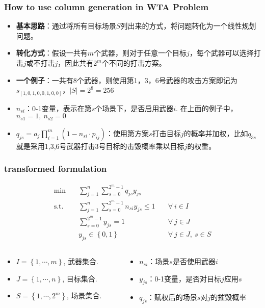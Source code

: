 \documentclass[CJK,10pt]{beamer}
\newcommand{\sumFromTo}[3]{\ensuremath{\sum_{#1}^{#2} #3}}
\newcommand{\optimalProblem}[3]
{\begin{align*}
    #1 \quad &#2 \\
    \mathrm{s. t.}\quad&#3
\end{align*}}
\begin{document}
\begin{frame}
    \frametitle{How to use column generation in WTA Problem}
    \begin{itemize}
		\item \textbf{基本思路}：通过将所有目标场景$S$列出来的方式，将问题转化为一个线性规划问题。
		\item \textbf{转化方式}：假设一共有$m$个武器，则对于任意一个目标$j$，每个武器可以选择打击$j$或不打击$j$，因此共有$2^m$个不同的打击方案。
		\item \textbf{一个例子}：一共有8个武器，则使用第1，3，6号武器的攻击方案即记为$s_{[1,0,1,0,0,1,0,0]}$，$|S| = 2^8 = 256$
		\item $n_{si}$：0-1变量，表示在第$s$个场景下，是否启用武器$i$. 在上面的例子中，$n_{s1} = 1,\ n_{s2} = 0$
		\item $q_{js} = a_j \prod_{i = 1}^m (1 - n_{si}\cdot p_{ij})$：使用第方案$s$打击目标$j$的概率并加权，比如$q_{3s}$就是采用1,3,6号武器打击$3$号目标的击毁概率乘以目标$j$的权重。
	\end{itemize}
\end{frame}

\begin{frame}
    \frametitle{transformed formulation}
    \optimalProblem{\min}{\sumFromTo{j = 1}{n}{\sumFromTo{s = 0}{2^m -1}{q_{js}y_{js}}}\tag{CG}}{\sumFromTo{j = 1}{n}{\sumFromTo{s = 0}{2^m -1}{n_{si}y_{js}}}\leq 1 \quad &\forall ~ i \in I\\& \sumFromTo{s = 0}{2^m - 1}{y_{js}} = 1 \quad &\forall ~ j \in J\\& y_{js} \in \left\{ 0,1 \right\} &\forall ~ j\in J,\ s\in S}
    \begin{columns}
        \begin{column}{.70\linewidth}
            \footnotesize
            \begin{itemize}
                \item $I = \left\{1,\cdots,m\right\} $, 武器集合.
                \item $J = \left\{1,\cdots,n\right\} $, 目标集合.
                \item $S = \left\{1,\cdots,2^m\right\}$, 场景集合.
            \end{itemize}
        \end{column}
    \hspace{-3cm}
        \begin{column}{.70\linewidth}
            \footnotesize
            \begin{itemize}
                \item $n_{si}$：场景$s$是否使用武器$i$
                \item $y_{js}$：0-1变量，是否对目标$j$应用$s$
                \item $q_{js}$：赋权后的场景$s$对$j$的摧毁概率
            \end{itemize}
        \end{column}
    \end{columns}
\end{frame}
\end{document}
